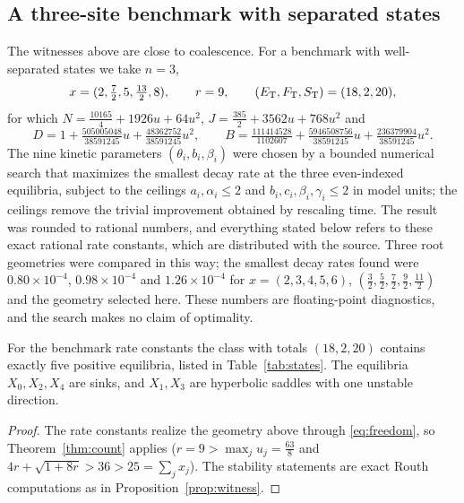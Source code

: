 \subsection{A three-site benchmark with separated states}\label{sec:benchmark}
The witnesses above are close to coalescence. For a benchmark with well-separated states we
take \(n=3\),
\[
 x=(2,\tfrac72,5,\tfrac{13}{2},8),\qquad r=9,\qquad (E_{\mathrm T},F_{\mathrm T},S_{\mathrm T})=(18,2,20),
\]
for which \(N=\tfrac{10165}{4}+1926u+64u^2\), \(J=\tfrac{385}{2}+3562u+768u^2\) and
\[
 D=1+\tfrac{505005048}{38591245}u+\tfrac{48362752}{38591245}u^2,\qquad
 B=\tfrac{111414528}{1102607}+\tfrac{5946508756}{38591245}u+\tfrac{236379904}{38591245}u^2 .
\]
The nine kinetic parameters \((\theta_i,b_i,\beta_i)\) were chosen by a bounded numerical
search that maximizes the smallest decay rate at the three even-indexed equilibria, subject to
the ceilings \(a_i,\alpha_i\le2\) and \(b_i,c_i,\beta_i,\gamma_i\le2\) in model units; the
ceilings remove the trivial improvement obtained by rescaling time. The result was rounded to
rational numbers, and everything stated below refers to these exact rational rate constants,
which are distributed with the source. Three root geometries were compared in this way; the
smallest decay rates found were \(0.80\times10^{-4}\), \(0.98\times10^{-4}\) and
\(1.26\times10^{-4}\) for \(x=(2,3,4,5,6)\), \((\tfrac32,\tfrac52,\tfrac72,\tfrac92,\tfrac{11}2)\) and
the geometry selected here. These numbers are floating-point diagnostics, and the search makes
no claim of optimality.

\begin{proposition}\label{prop:benchmark}
For the benchmark rate constants the class with totals \((18,2,20)\) contains exactly five
positive equilibria, listed in Table~\ref{tab:states}. The equilibria \(X_0,X_2,X_4\) are
sinks, and \(X_1,X_3\) are hyperbolic saddles with one unstable direction.
\end{proposition}
\begin{proof}
The rate constants realize the geometry above through \eqref{eq:freedom}, so
Theorem~\ref{thm:count} applies (\(r=9>\max_ju_j=\tfrac{63}{8}\) and
\(4r+\sqrt{1+8r}>36>25=\sum_jx_j\)). The stability statements are exact Routh computations as
in Proposition~\ref{prop:witness}.
\end{proof}


